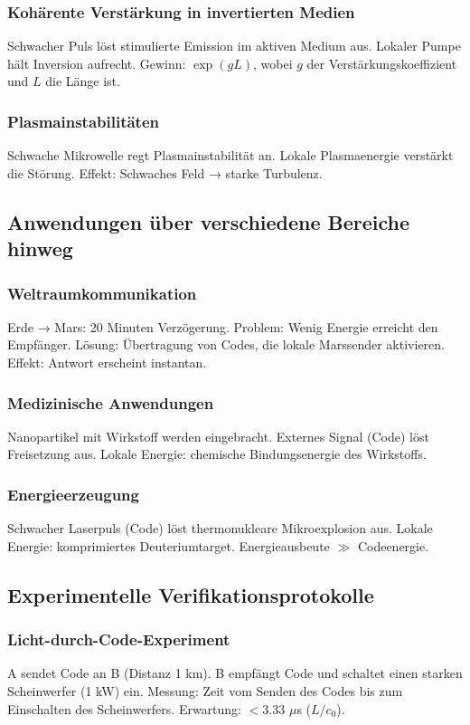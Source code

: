 \documentclass[11pt,a4paper]{article}
\begin{document}
	\subsubsection{Kohärente Verstärkung in invertierten Medien}
	Schwacher Puls löst stimulierte Emission im aktiven Medium aus. Lokaler Pumpe hält Inversion aufrecht. Gewinn: $\exp(gL)$, wobei $g$ der Verstärkungskoeffizient und $L$ die Länge ist.
	
	\subsubsection{Plasmainstabilitäten}
	Schwache Mikrowelle regt Plasmainstabilität an. Lokale Plasmaenergie verstärkt die Störung. Effekt: Schwaches Feld → starke Turbulenz.
	
	\subsection{Anwendungen über verschiedene Bereiche hinweg}
	
	\subsubsection{Weltraumkommunikation}
	Erde → Mars: 20 Minuten Verzögerung. Problem: Wenig Energie erreicht den Empfänger. Lösung: Übertragung von Codes, die lokale Marssender aktivieren. Effekt: Antwort erscheint instantan.
	
	\subsubsection{Medizinische Anwendungen}
	Nanopartikel mit Wirkstoff werden eingebracht. Externes Signal (Code) löst Freisetzung aus. Lokale Energie: chemische Bindungsenergie des Wirkstoffs.
	
	\subsubsection{Energieerzeugung}
	Schwacher Laserpuls (Code) löst thermonukleare Mikroexplosion aus. Lokale Energie: komprimiertes Deuteriumtarget. Energieausbeute $\gg$ Codeenergie.
	
	\subsection{Experimentelle Verifikationsprotokolle}
	
	\subsubsection{Licht-durch-Code-Experiment}
	A sendet Code an B (Distanz 1 km). B empfängt Code und schaltet einen starken Scheinwerfer (1 kW) ein. Messung: Zeit vom Senden des Codes bis zum Einschalten des Scheinwerfers. Erwartung: $< 3.33$ $\mu$s ($L/c_0$).
	
\end{document}
